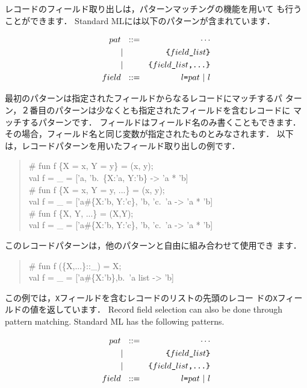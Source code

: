 \documentclass{jbook}
\begin{document}
\ifjp%
	レコードのフィールド取り出しは，パターンマッチングの機能を用いて
も行うことができます．
	Standard MLには以下のパターンが含まれています．
\begin{tt}
\begin{eqnarray*}
pat &\mbox{\ \ }::=& \cdots \\
     &|& \mbox{\tt \{$field\_list$\}}
\\
     &|& \mbox{\tt \{$field\_list$,...\}}
\\
field &\mbox{\ \ }::=& \mbox{\tt $l$=$pat$} \ | \ l
\end{eqnarray*}
\end{tt}
	最初のパターンは指定されたフィールドからなるレコードにマッチするパ
ターン，２番目のパターンは少なくとも指定されたフィールドを含むレコードに
マッチするパターンです．
	フィールドはフィールド名のみ書くこともできます．
	その場合，フィールド名と同じ変数が指定されたものとみなされます．
	以下は，レコードパターンを用いたフィールド取り出しの例です．
\begin{tt}\begin{quote}
\# fun f \{X = x, Y = y\} = (x, y);\\
val f = \_ = ['a, 'b.~\{X:'a, Y:'b\} -> 'a * 'b]\\
\# fun f \{X = x, Y = y, ...\} = (x, y);\\
val f = \_ = ['a\#\{X:'b, Y:'c\}, 'b, 'c.~'a -> 'a * 'b]\\
\# fun f \{X, Y, ...\} = (X,Y);\\
val f = \_ = ['a\#\{X:'b, Y:'c\}, 'b, 'c.~'a -> 'a * 'b]
\end{quote}\end{tt}
	このレコードパターンは，他のパターンと自由に組み合わせて使用でき
ます．
\begin{tt}\begin{quote}
\# fun f (\{X,...\}::\_) = X;\\
val f = \_ = ['a\#\{X:'b\},b.~'a list -> 'b]\\
\end{quote}\end{tt}
	この例では，{\tt X}フィールドを含むレコードのリストの先頭のレコー
ドの{\tt X}フィールドの値を返しています．
\else%
	Record field selection can also be done through pattern
matching.
	Standard ML has the following patterns.
\begin{tt}
\begin{eqnarray*}
pat &\mbox{\ \ }::=& \cdots \\
     &|& \mbox{\tt \{$field\_list$\}}
\\
     &|& \mbox{\tt \{$field\_list$,...\}}
\\
field &\mbox{\ \ }::=& \mbox{\tt $l$=$pat$} \ | \ l
\end{eqnarray*}
\end{tt}
\end{document}
